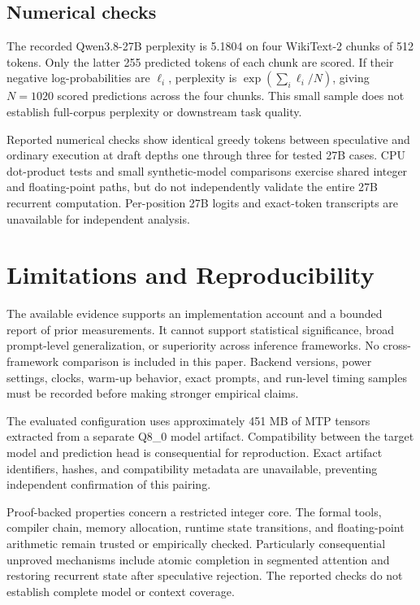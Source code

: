 \documentclass[10pt]{article}
\begin{document}
\subsection{Numerical checks}
The recorded Qwen3.8-27B perplexity is 5.1804 on four WikiText-2 chunks of 512 tokens. Only the latter 255 predicted tokens of each chunk are scored. If their negative log-probabilities are $\ell_i$, perplexity is $\exp(\sum_i\ell_i/N)$, giving $N=1020$ scored predictions across the four chunks. This small sample does not establish full-corpus perplexity or downstream task quality.

Reported numerical checks show identical greedy tokens between speculative and ordinary execution at draft depths one through three for tested 27B cases. CPU dot-product tests and small synthetic-model comparisons exercise shared integer and floating-point paths, but do not independently validate the entire 27B recurrent computation. Per-position 27B logits and exact-token transcripts are unavailable for independent analysis.

\section{Limitations and Reproducibility}
The available evidence supports an implementation account and a bounded report of prior measurements. It cannot support statistical significance, broad prompt-level generalization, or superiority across inference frameworks. No cross-framework comparison is included in this paper. Backend versions, power settings, clocks, warm-up behavior, exact prompts, and run-level timing samples must be recorded before making stronger empirical claims.

The evaluated configuration uses approximately 451 MB of MTP tensors extracted from a separate Q8\_0 model artifact. Compatibility between the target model and prediction head is consequential for reproduction. Exact artifact identifiers, hashes, and compatibility metadata are unavailable, preventing independent confirmation of this pairing.

Proof-backed properties concern a restricted integer core. The formal tools, compiler chain, memory allocation, runtime state transitions, and floating-point arithmetic remain trusted or empirically checked. Particularly consequential unproved mechanisms include atomic completion in segmented attention and restoring recurrent state after speculative rejection. The reported checks do not establish complete model or context coverage.
\end{document}
